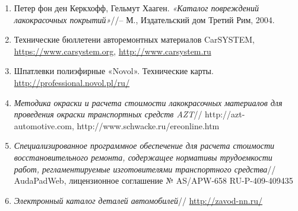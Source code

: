 \begin{enumerate}
\item Петер фон ден Керкхофф, Гельмут Хааген. \emph{«Каталог повреждений лакокрасочных покрытий»}//-- М., Издательский дом Третий Рим, 2004.
\item Технические бюллетени авторемонтных материалов CarSYSTEM, \url{https://www.carsystem.org}, \url{http://www.carsystem.ru}
%
\item Шпатлевки полиэфирные «Novol». Технические карты. \url{http://professional.novol.pl/ru/}
%
\item
\emph{Методика окраски и расчета стоимости лакокрасочных материалов для проведения окраски транспортных средств   AZT}// http://azt-automotive.com,   http://www.schwacke.ru/\-ereonline.htm

%
\item
\emph{Специализированное программное обеспечение для расчета стоимости  восстановительного ремонта, содержащее нормативы трудоемкости работ, регламентируемые изготовителями транспортного средства}//   AudaPadWeb, лицензионное соглашение № AS/APW-658  RU-P-409-409435

%
\item
\emph{Электронный каталог деталей автомобилей}// \url{http://zavod-nn.ru/}


\end{enumerate}

